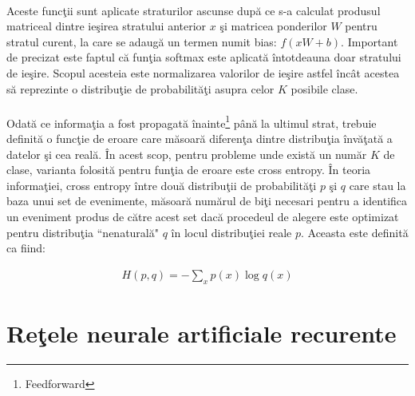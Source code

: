 \paragraph{}
Aceste func\c tii sunt aplicate straturilor ascunse dup\u a ce s-a calculat produsul matriceal dintre ie\c sirea stratului anterior \(x\) \c si matricea ponderilor \(W\) pentru stratul curent, la care se adaug\u a un termen numit bias: \(f(xW+b)\). Important de precizat este faptul c\u a fun\c tia softmax este aplicat\u a \^ intotdeauna doar stratului de ie\c sire. Scopul acesteia este normalizarea valorilor de ie\c sire astfel \^ inc\^ at acestea s\u a reprezinte o distribu\c tie de probabilit\u a\c ti asupra celor \(K\) posibile clase.

\paragraph{}
Odat\u a ce informa\c tia a fost propagat\u a \^ inainte\footnote{Feedforward} p\^ an\u a la ultimul strat, trebuie definit\u a o func\c tie de eroare care m\u asoar\u a diferen\c ta dintre distribu\c tia \^ inv\u a\c tat\u a a datelor \c si cea real\u a. \^ In acest scop, pentru probleme unde exist\u a un num\u ar \(K\) de clase, varianta folosit\u a pentru fun\c tia de eroare este cross entropy. \^ In teoria informa\c tiei, cross entropy \^ intre dou\u a distribu\c tii de probabilit\u a\c ti \(p\) \c si \(q\) care stau la baza unui set de evenimente, m\u asoar\u a num\u arul de bi\c ti necesari pentru a identifica un eveniment produs de c\u atre acest set dac\u a procedeul de alegere este optimizat pentru distribu\c tia ``nenatural\u a" \(q\) \^ in locul distribu\c tiei reale \(p\). Aceasta este definit\u a ca fiind:

\begin{equation}
\begin{split}
H(p,q)=-\sum_{x}p(x)\log q(x)
\end{split}
\end{equation}


\section{Re\c tele neurale artificiale recurente}

